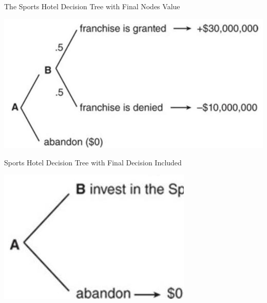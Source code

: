 \documentclass[11pt]{article}
\begin{document}
The Sports Hotel Decision Tree with Final Nodes Value

\begin{center}
\includegraphics[max width=\textwidth]{2024_04_11_73a6b5609218251c8b58g-3(2)}
\end{center}

Sports Hotel Decision Tree with Final Decision Included

\begin{center}
\includegraphics[max width=\textwidth]{2024_04_11_73a6b5609218251c8b58g-4}
\end{center}
\end{document}

